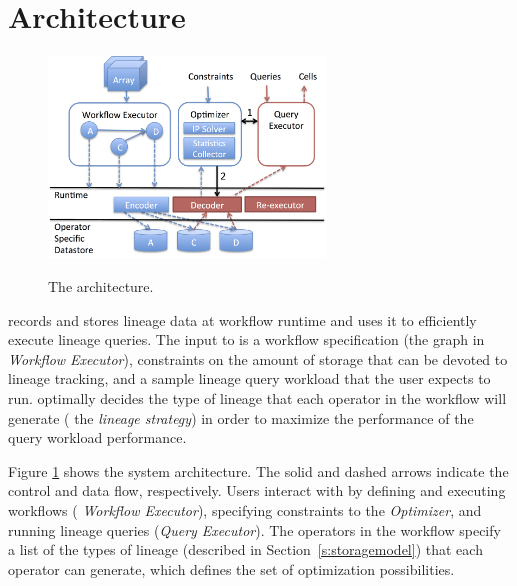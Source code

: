 \section{Architecture}
\label{s:arch}



\begin{figure}[h!]
\begin{center}
   \includegraphics[width=2.9in,natwidth=6.38in,natheight=4.66in]{figures/arch.png}
\caption{The \sys{} architecture.  }
\vspace{-.1in} 
\label{f:arch}
\end{center}
\end{figure}

\sys{} records and stores lineage data at workflow runtime and uses it
to efficiently execute lineage queries.  The input to \sys{} is a
workflow specification (the graph in {\it Workflow Executor}),
constraints on the amount of storage that can be devoted to lineage
tracking, and a sample lineage query workload that the user expects to run.  \sys{} optimally decides
the type of lineage that each operator in the workflow will
generate ( the {\it lineage strategy}) in order to maximize the
performance of the query workload performance.


Figure \ref{f:arch} shows the system architecture.  The solid and
dashed arrows indicate the control and data flow, respectively.  Users
interact with \sys{} by defining and executing workflows ({\it
  Workflow Executor}), specifying constraints to the {\it Optimizer},
and running lineage queries ({\it Query Executor}).  The operators
in the workflow specify a list of the types of lineage
(described in Section~\ref{s:storagemodel}) that each operator can
generate, which defines the set of optimization possibilities.  

